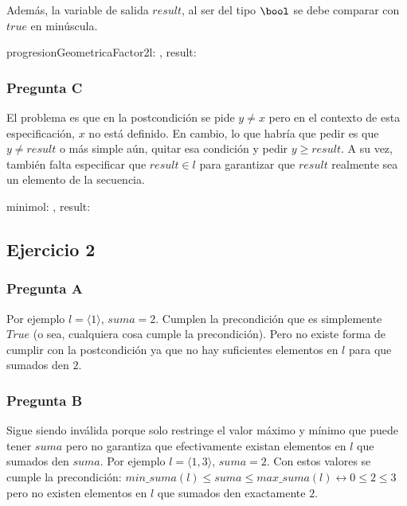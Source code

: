 Además, la variable de salida $result$, al ser del tipo $\bool$ se debe comparar con $true$ en minúscula.

\begin{proc}{progresionGeometricaFactor2}{\In l: \TLista{\ent}, \Out result: \bool}{}
\end{proc}

\subsubsection{Pregunta C}

El problema es que en la postcondición se pide $y \neq x$ pero en el contexto de esta especificación, $x$ no está definido. En cambio, lo que habría que pedir es que $y \neq result$ o más simple aún, quitar esa condición y pedir $y \geq result$. A su vez, también falta especificar que $result \in l$ para garantizar que $result$ realmente sea un elemento de la secuencia.

\begin{proc}{minimo}{\In l: \TLista{\ent}, \Out result: \ent}{}
\end{proc}

\subsection{Ejercicio 2}

\subsubsection{Pregunta A}

Por ejemplo $l = \langle 1 \rangle$, $suma = 2$. Cumplen la precondición que es simplemente $True$ (o sea, cualquiera cosa cumple la precondición). Pero no existe forma de cumplir con la postcondición ya que no hay suficientes elementos en $l$ para que sumados den $2$.

\subsubsection{Pregunta B}

Sigue siendo inválida porque solo restringe el valor máximo y mínimo que puede tener $suma$ pero no garantiza que efectivamente existan elementos en $l$ que sumados den $suma$. Por ejemplo $l = \langle 1, 3 \rangle$, $suma = 2$. Con estos valores se cumple la precondición: $min\_suma(l) \leq suma \leq max\_suma(l) \leftrightarrow 0 \leq 2 \leq 3$ pero no existen elementos en $l$ que sumados den exactamente $2$.

